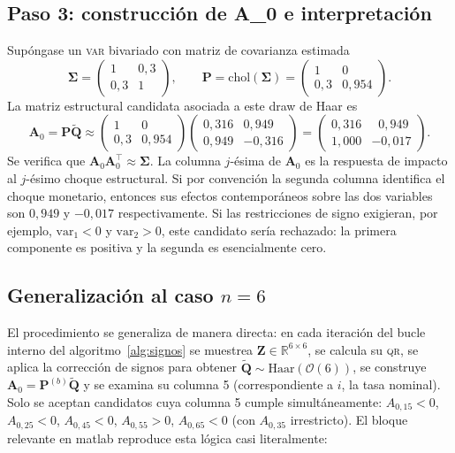 \documentclass[11pt,letterpaper]{article}
\begin{document}
\subsection{Paso 3: construcción de A\_0 e interpretación}

Supóngase un \textsc{var} bivariado con matriz de covarianza estimada
\begin{equation}
\bm{\Sigma} = \begin{pmatrix} 1 & 0{,}3 \\ 0{,}3 & 1 \end{pmatrix},
\qquad
\bm{P} = \mathrm{chol}(\bm{\Sigma}) =
\begin{pmatrix} 1 & 0 \\ 0{,}3 & 0{,}954 \end{pmatrix}.
\end{equation}
La matriz estructural candidata asociada a este draw de Haar es
\begin{equation}
\bm{A}_0 = \bm{P}\tilde{\bm{Q}} \approx
\begin{pmatrix} 1 & 0 \\ 0{,}3 & 0{,}954 \end{pmatrix}
\begin{pmatrix} 0{,}316 & 0{,}949 \\ 0{,}949 & -0{,}316 \end{pmatrix}
=
\begin{pmatrix} 0{,}316 & \;\;0{,}949 \\ 1{,}000 & -0{,}017 \end{pmatrix}.
\end{equation}
Se verifica que $\bm{A}_0 \bm{A}_0^\top \approx \bm{\Sigma}$. La columna $j$-ésima de $\bm{A}_0$ es la respuesta de impacto al $j$-ésimo choque estructural. Si por convención la segunda columna identifica el choque monetario, entonces sus efectos contemporáneos sobre las dos variables son $0{,}949$ y $-0{,}017$ respectivamente. Si las restricciones de signo exigieran, por ejemplo, $\text{var}_1 < 0$ y $\text{var}_2 > 0$, este candidato sería rechazado: la primera componente es positiva y la segunda es esencialmente cero.

\subsection{Generalización al caso $n=6$}

El procedimiento se generaliza de manera directa: en cada iteración del bucle interno del algoritmo~\ref{alg:signos} se muestrea $\bm{Z}\in\mathbb{R}^{6\times 6}$, se calcula su \textsc{qr}, se aplica la corrección de signos para obtener $\tilde{\bm{Q}}\sim\mathrm{Haar}(\mathcal{O}(6))$, se construye $\bm{A}_0 = \bm{P}^{(b)} \tilde{\bm{Q}}$ y se examina su columna 5 (correspondiente a $i$, la tasa nominal). Solo se aceptan candidatos cuya columna 5 cumple simultáneamente: $A_{0,15} < 0$, $A_{0,25} < 0$, $A_{0,45} < 0$, $A_{0,55} > 0$, $A_{0,65} < 0$ (con $A_{0,35}$ irrestricto). El bloque relevante en \textsf{matlab} reproduce esta lógica casi literalmente:
\end{document}
